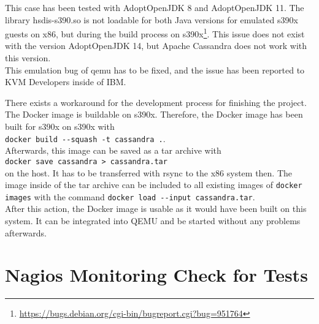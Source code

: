 This case has been tested with AdoptOpenJDK 8 and AdoptOpenJDK 11. The library hsdis-s390.so is not loadable for both Java versions for emulated s390x guests on x86, but during the build process on s390x\footnote{\url{https://bugs.debian.org/cgi-bin/bugreport.cgi?bug=951764}}. This issue does not exist with the version AdoptOpenJDK 14, but Apache Cassandra does not work with this version. \\
This emulation bug of qemu has to be fixed, and the issue has been reported to \gls{KVM} Developers inside of IBM. 

There exists a workaround for the development process for finishing the project. The Docker image is buildable on s390x. Therefore, the Docker image has been built for s390x on s390x with \\  
\lstinline!docker build --squash -t cassandra .!. \\
Afterwards, this image can be saved as a tar archive with \\
\lstinline!docker save cassandra > cassandra.tar!\\ 
on the host. It has to be transferred with rsync to the x86 system then. The image inside of the tar archive can be included to all existing images of \lstinline!docker images! with the command 
\lstinline!docker load --input cassandra.tar!. \\
After this action, the Docker image is usable as it would have been built on this system. 
It can be integrated into \gls{QEMU} and be started without any problems afterwards.

\section{Nagios Monitoring Check for Tests} \label{monitoring}

